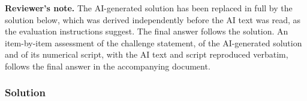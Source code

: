 \providecommand{\citep}[2][]{\cite{#2}}
\providecommand{\citet}[2][]{\cite{#2}}
\providecommand{\citealt}[2][]{\cite{#2}}
\providecommand{\nat}{Nature}
\providecommand{\prl}{Physical Review Letters}
\providecommand{\prd}{Physical Review D}
\providecommand{\pra}{Physical Review A}

{\color{blue}\textbf{Reviewer's note.} The AI-generated solution has been replaced in full by the solution below, which was derived independently before the AI text was read, as the evaluation instructions suggest. The final answer follows the solution. An item-by-item assessment of the challenge statement, of the AI-generated solution and of its numerical script, with the AI text and script reproduced verbatim, follows the final answer in the accompanying document.}

\subsubsection*{Solution}

